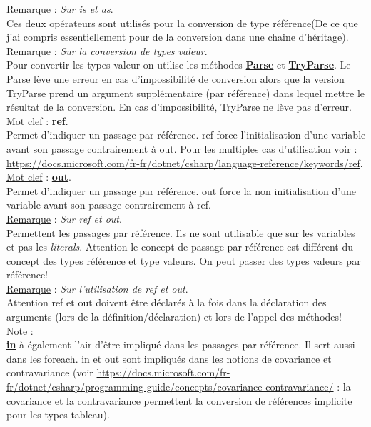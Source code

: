 \documentclass[a4paper,12pt,twoside]{article}
\newcommand{\urlcolor}{magenta}  %
\newcommand{\keycolor}{purple} %
\newcommand{\incode}[1]{{\footnotesize\ttfamily #1}} %
\newcommand{\rem}[2]{\noindent\underline{Remarque} : \textit{#1}.\\ \indent #2}
\newcommand{\note}[1]{\noindent\underline{Note} : \\ \indent #1}
\newcommand{\keyref}[2]{\hypersetup{urlcolor=\keycolor} \href{#1}{\textbf{#2}}\hypersetup{urlcolor=\urlcolor}}
\newcommand{\keyword}[3]{\noindent\underline{Mot clef} : \keyref{#1}{#2}. \\ \indent #3}
\begin{document}
\rem{Sur \incode{is} et \incode{as}}{Ces deux opérateurs sont utilisés pour la conversion de type référence(De ce que j'ai compris essentiellement pour de la conversion dans une chaine d'héritage).}\\

\rem{Sur la conversion de types valeur}{Pour convertir les types valeur on utilise les méthodes \keyref{https://docs.microsoft.com/fr-fr/dotnet/api/system.int32.parse?view=net-6.0}{Parse} et \keyref{https://docs.microsoft.com/fr-fr/dotnet/api/system.int32.tryparse?view=net-6.0}{TryParse}. Le \incode{Parse} lève une erreur en cas d'impossibilité de conversion alors que la version \incode{TryParse} prend un argument supplémentaire (par référence) dans lequel mettre le résultat de la conversion. En cas d'impossibilité, \incode{TryParse} ne lève pas d'erreur.}\\

\keyword{https://docs.microsoft.com/fr-fr/dotnet/csharp/language-reference/keywords/ref}{ref}{Permet d'indiquer un passage par référence. \incode{ref} force l'initialisation d'une variable avant son passage contrairement à \incode{out}. Pour les multiples cas d'utilisation voir : \url{https://docs.microsoft.com/fr-fr/dotnet/csharp/language-reference/keywords/ref}.}\\

\keyword{https://docs.microsoft.com/fr-fr/dotnet/csharp/language-reference/keywords/out-parameter-modifier}{out}{Permet d'indiquer un passage par référence. \incode{out} force la non initialisation d'une variable avant son passage contrairement à \incode{ref}.}\\

\rem{Sur \incode{ref} et \incode{out}}{Permettent les passages par référence. Ils ne sont utilisable que sur les variables et pas les \textit{literals}. Attention le concept de passage par référence est différent du concept des types référence et type valeurs. On peut passer des types valeurs par référence!}\\

\rem{Sur l'utilisation de \incode{ref} et \incode{out}}{Attention \incode{ref} et \incode{out} doivent être déclarés à la fois dans la déclaration des arguments (lors de la définition/déclaration) et lors de l'appel des méthodes!}\\

\note{\keyref{https://docs.microsoft.com/fr-fr/dotnet/csharp/language-reference/keywords/in-generic-modifier}{in} à également l'air d'être impliqué dans les passages par référence. Il sert aussi dans les \incode{foreach}. \incode{in} et \incode{out} sont impliqués dans les notions de covariance et contravariance (voir \url{https://docs.microsoft.com/fr-fr/dotnet/csharp/programming-guide/concepts/covariance-contravariance/} : la covariance et la contravariance permettent la conversion de références implicite pour les types tableau).}\\
\end{document}
